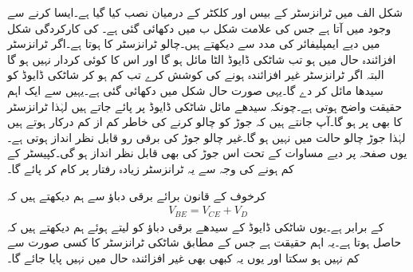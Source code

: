 شکل  الف میں ٹرانزسٹر کے بیس اور کلکٹر  کے درمیان  نصب کیا گیا ہے۔ایسا کرنے سے  وجود میں آتا ہے جس کی علامت شکل  ب میں دکھائی گئی ہے۔ کی کارکردگی شکل  میں دیے ایمپلیفائر کی مدد سے دیکھتے ہیں۔چالو ٹرانزسٹر کا  ہوتا ہے۔اگر ٹرانزسٹر افزائندہ حال میں ہو تب شاٹکی ڈایوڈ الٹا مائل ہو گا اور اس کا کوئی کردار نہیں ہو گا البتہ اگر ٹرانزسٹر غیر افزائندہ ہونے کی کوشش کرے تب   کم ہو کر  شاٹکی ڈایوڈ کو سیدھا مائل کر دے گا۔یہی صورت حال شکل میں دکھائی گئی ہے۔یہیں سے ایک اہم حقیقت واضح ہوتی ہے۔چونکہ سیدھے مائل شاٹکی ڈایوڈ پر  پائے جاتے ہیں لہٰذا ٹرانزسٹر کا  بھی  پر ہو گا۔آپ جانتے ہیں کہ  جوڑ کو چالو کرنے کی خاطر کم از کم  درکار ہوتے ہیں لہٰذا  جوڑ چالو حالت میں نہیں ہو گا۔غیر چالو جوڑ کی برقی رو قابل نظر انداز ہوتی ہے۔یوں صفحہ  پر دیے مساوات  کے تحت اس جوڑ کی  بھی قابل نظر انداز ہو گی۔کپیسٹر کے کم ہونے کی وجہ سے یہ ٹرانزسٹر زیادہ رفتار پر کام کر پائے گا۔

کرخوف کے قانون برائے برقی دباؤ سے ہم دیکھتے ہیں کہ
\begin{align*}
V_{BE}=V_{CE}+V_D
\end{align*}
کے برابر ہے۔یوں شاٹکی ڈایوڈ کے سیدھے برقی دباؤ کو  لیتے ہوئے ہم دیکھتے ہیں کہ  حاصل ہوتا ہے۔یہ اہم حقیقت ہے جس کے مطابق شاٹکی ٹرانزسٹر کا  کسی صورت  سے کم نہیں ہو سکتا اور یوں یہ کبھی بھی غیر افزائندہ حال میں نہیں پایا جائے گا۔

